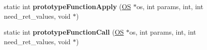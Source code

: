 \begin{DoxyCompactItemize}
\item 
static int {\bfseries prototype\+Function\+Apply} (\hyperlink{class_object_script_1_1_o_s}{OS} $\ast$os, int params, int, int need\+\_\+ret\+\_\+values, void $\ast$)\hypertarget{class_object_script_1_1_o_s_1_1_core_a1af4853933e1748a5194f49ee68c3ff0}{}\label{class_object_script_1_1_o_s_1_1_core_a1af4853933e1748a5194f49ee68c3ff0}

\item 
static int {\bfseries prototype\+Function\+Call} (\hyperlink{class_object_script_1_1_o_s}{OS} $\ast$os, int params, int, int need\+\_\+ret\+\_\+values, void $\ast$)\hypertarget{class_object_script_1_1_o_s_1_1_core_af86b69bc9e926261db59fafaee9b37a5}{}\label{class_object_script_1_1_o_s_1_1_core_af86b69bc9e926261db59fafaee9b37a5}

\end{DoxyCompactItemize}
